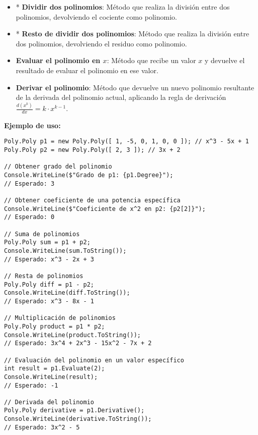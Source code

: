 \begin{itemize}
    \item * \textbf{Dividir dos polinomios}: Método que realiza la división entre dos polinomios, devolviendo el cociente como polinomio.

     \item * \textbf{Resto de dividir dos polinomios}: Método que realiza la división entre dos polinomios, devolviendo el residuo como polinomio.
    
    \item \textbf{Evaluar el polinomio en \(x\)}: Método que recibe un valor \(x\) y devuelve el resultado de evaluar el polinomio en ese valor.
    
    \item \textbf{Derivar el polinomio}: Método que devuelve un nuevo polinomio resultante de la derivada del polinomio actual, aplicando la regla de derivación \(\frac{d(x^k)}{dx} = k \cdot x^{k-1}\).
\end{itemize}

\textbf{Ejemplo de uso:}
\begin{lstlisting}
Poly.Poly p1 = new Poly.Poly([ 1, -5, 0, 1, 0, 0 ]); // x^3 - 5x + 1
Poly.Poly p2 = new Poly.Poly([ 2, 3 ]); // 3x + 2

// Obtener grado del polinomio
Console.WriteLine($"Grado de p1: {p1.Degree}");
// Esperado: 3

// Obtener coeficiente de una potencia específica
Console.WriteLine($"Coeficiente de x^2 en p2: {p2[2]}");
// Esperado: 0

// Suma de polinomios
Poly.Poly sum = p1 + p2;
Console.WriteLine(sum.ToString());
// Esperado: x^3 - 2x + 3

// Resta de polinomios
Poly.Poly diff = p1 - p2;
Console.WriteLine(diff.ToString());
// Esperado: x^3 - 8x - 1

// Multiplicación de polinomios
Poly.Poly product = p1 * p2;
Console.WriteLine(product.ToString());
// Esperado: 3x^4 + 2x^3 - 15x^2 - 7x + 2

// Evaluación del polinomio en un valor específico
int result = p1.Evaluate(2);
Console.WriteLine(result);
// Esperado: -1

// Derivada del polinomio
Poly.Poly derivative = p1.Derivative();
Console.WriteLine(derivative.ToString());
// Esperado: 3x^2 - 5
\end{lstlisting}